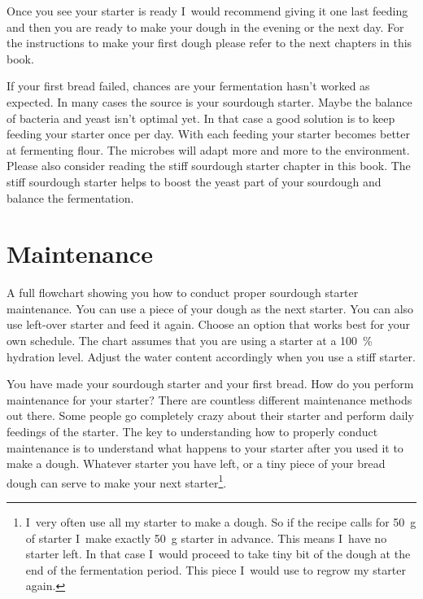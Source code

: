 Once you see your starter is ready I~would recommend giving it
one last feeding and then you are ready to make your dough in the
evening or the next day. For the instructions to make your
first dough please refer to the next chapters in this book.

If your first bread failed, chances are your fermentation hasn't
worked as expected. In many cases the source is your sourdough starter. Maybe
the balance of bacteria and yeast isn't optimal yet. In that case a good
solution is to keep feeding your starter once per day. With each feeding your
starter becomes better at fermenting flour. The microbes will adapt more and
more to the environment. Please also consider reading the stiff sourdough starter
chapter in this book. The stiff sourdough starter helps to boost the
yeast part of your sourdough and balance the fermentation.

\section{Maintenance}

\begin{flowchart}[!htb]
\begin{center}
  
  \caption[Sourdough starter maintenance flowchart]{A full flowchart showing
      you how to conduct proper sourdough starter maintenance. You can use a
      piece of your dough as the next starter. You can also use left-over
      starter and feed it again. Choose an option that works best for your own
      schedule. The chart assumes that you are using a starter at a
      \qty{100}{\percent} hydration level. Adjust the water content
      accordingly when you use a stiff starter.}%
  \label{fig:sourdough-maintenance-process}
\end{center}
\end{flowchart}

You have made your sourdough starter and your first bread. How do you perform
maintenance for your starter? There are countless different maintenance
methods out there. Some people go completely crazy about their starter and
perform daily feedings of the starter. The key to understanding how to properly
conduct maintenance is to understand what happens to your starter after you
used it to make a dough. Whatever starter you have left, or a tiny piece of
your bread dough can serve to make your next starter\footnote{I~very often use all my
starter to make a dough. So if the recipe calls for \qty{50}{\gram} of starter I~make
exactly \qty{50}{\gram} starter in advance. This means I~have no starter left. In that
case I~would proceed to take tiny bit of the dough at the end of the
fermentation period. This piece I~would use to regrow my starter again.}.

